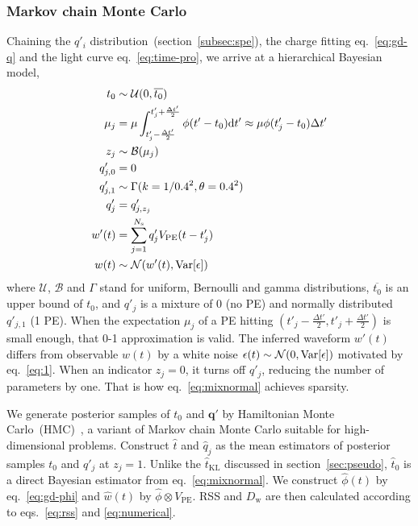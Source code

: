 \subsubsection{Markov chain Monte Carlo}
\label{subsec:mcmc}
Chaining the $q'_i$ distribution~(section~\ref{subsec:spe}), the charge fitting eq.~\eqref{eq:gd-q} and the light curve eq.~\eqref{eq:time-pro}, we arrive at a hierarchical Bayesian model,
\begin{equation}
  \begin{aligned}
    t_{0} &\sim \mathcal{U}(0, \overline{t_0}) \\
    \mu_j &= \mu \int_{t'_j-\frac{\Delta t'}{2}}^{t'_j+\frac{\Delta t'}{2}} \phi(t' - t_0)\mathrm{d}t' \approx \mu\phi(t'_j - t_0)\Delta{t'} \\
    z_j &\sim \mathcal{B}(\mu_j) \\
    q'_{j,0}&=0\\
    q'_{j,1}& \sim \Gamma(k=1/0.4^2, \theta=0.4^2)\\
    q'_j &= q'_{j,z_j}\\
    w'(t) & = \sum_{j=1}^{N_\mathrm{s}}q'_jV_\mathrm{PE}(t-t'_j)\\
    w(t) &\sim \mathcal{N}(w'(t), \operatorname{Var}[\epsilon])
  \end{aligned}
  \label{eq:mixnormal}
\end{equation}
where $\mathcal{U}$, $\mathcal{B}$ and $\Gamma$ stand for uniform, Bernoulli and gamma distributions, $\overline{t_0}$ is an upper bound of $t_0$, and $q'_j$ is a mixture of 0 (no PE) and normally distributed $q'_{j,1}$ (1 PE). When the expectation $\mu_j$ of a PE hitting $(t'_{j} - \frac{\Delta t'}{2}, t'_{j} + \frac{\Delta t'}{2})$ is small enough, that 0-1 approximation is valid.  The inferred waveform $w'(t)$ differs from observable $w(t)$ by a white noise $\epsilon(t) \sim \mathcal{N}(0, \operatorname{Var}[\epsilon])$ motivated by eq.~\eqref{eq:1}.  When an indicator $z_j=0$, it turns off $q'_j$, reducing the number of parameters by one.  That is how eq.~\eqref{eq:mixnormal} achieves sparsity.

We generate posterior samples of $t_0$ and $\bm{q'}$ by Hamiltonian Monte Carlo~(HMC)~\cite{neal_mcmc_2012}, a variant of Markov chain Monte Carlo suitable for high-dimensional problems. Construct $\hat{t}$ and $\hat{q}_j$ as the mean estimators of posterior samples $t_0$ and $q'_j$ at $z_j=1$.  Unlike the $\hat{t}_\mathrm{KL}$ discussed in section~\ref{sec:pseudo}, $\hat{t}_0$ is a direct Bayesian estimator from eq.~\eqref{eq:mixnormal}.  We construct $\hat{\phi}(t)$ by eq.~\eqref{eq:gd-phi} and $\hat{w}(t)$ by $\hat{\phi} \otimes V_\mathrm{PE}$. RSS and $D_\mathrm{w}$ are then calculated according to eqs.~\eqref{eq:rss} and \eqref{eq:numerical}.


